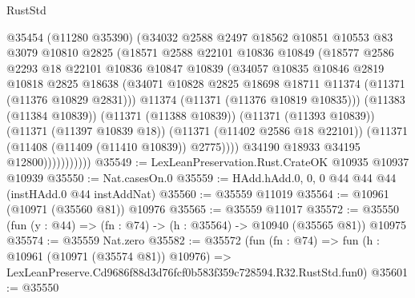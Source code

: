 \begin{lexlean}{RustStd}
\begin{coremodule}
                        @35454
                        (@11280 @35390)
                        (@34032
                          @2588
                          @2497
                          @18562
                          @10851
                          @10553
                          @83
                          @3079
                          @10810
                          @2825
                          (@18571
                            @2588
                            @22101
                            @10836
                            @10849
                            (@18577
                              @2586
                              @2293
                              @18
                              @22101
                              @10836
                              @10847
                              @10839
                              (@34057
                                @10835
                                @10846
                                @2819
                                @10818
                                @2825
                                @18638
                                (@34071
                                  @10828
                                  @2825
                                  @18698
                                  @18711
                                  @11374
                                  (@11371 (@11376 @10829 @2831)))
                                @11374
                                (@11371 (@11376 @10819 @10835)))
                              (@11383 (@11384 @10839))
                              (@11371 (@11388 @10839))
                              (@11371 (@11393 @10839))
                              (@11371 (@11397 @10839 @18))
                              (@11371 (@11402 @2586 @18 @22101))
                              (@11371 (@11408 (@11409 (@11410 @10839)) @2775))))
                          @34190
                          @18933
                          @34195
                          @12800)))))))))))
@35549 := LexLeanPreservation.Rust.CrateOK @10935 @10937 @10939
@35550 := Nat.casesOn.{0}
@35559 := HAdd.hAdd.{0, 0, 0} @44 @44 @44 (instHAdd.{0} @44 instAddNat)
@35560 := @35559 @11019
@35564 := @10961 (@10971 (@35560 @81)) @10976
@35565 := @35559 @11017
@35572 := @35550 (fun (y : @44) => (fn : @74) -> (h : @35564) -> @10940 (@35565 @81)) @10975
@35574 := @35559 Nat.zero
@35582 := @35572
    (fun (fn : @74) =>
    fun (h : @10961 (@10971 (@35574 @81)) @10976) =>
    LexLeanPreserve.Cd9686f88d3d76fcf0b583f359c728594.R32.RustStd.fun0)
@35601 := @35550

\end{coremodule}
\end{lexlean}
